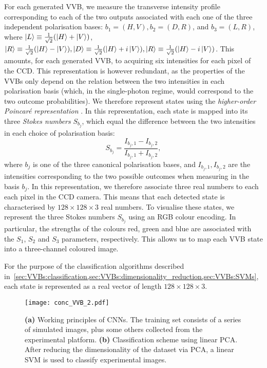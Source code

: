 For each generated \ac{VVB}, we measure the transverse intensity profile corresponding to each of the two outputs associated with each one of the three independent polarisation bases: $b_1=(H,V), b_2=(D,R)$, and $b_3=(L,R)$, where $\ket L\equiv \frac{1}{\sqrt2}(\ket H + \ket V)$, $\ket R\equiv \frac{1}{\sqrt2}(\ket H - \ket V), \ket D\equiv \frac{1}{\sqrt2}(\ket H + i \ket V), \ket R\equiv \frac{1}{\sqrt2}(\ket H - i \ket V)$.
This amounts, for each generated \ac{VVB}, to acquiring six intensities for each pixel of the \ac{CCD}. This representation is however redundant, as the properties of the VVBs only depend on the relation between the two intensities in each polarisation basis (which, in the single-photon regime, would correspond to the two outcome probabilities).
We therefore represent states using the \emph{higher-order Poincar\'e representation} \cite{milione2011higherorder,cardano2012polarization}. In this representation, each state is mapped into its three \emph{Stokes numbers} $S_{b_j}$, which equal the difference between the two intensities in each choice of polarisation basis:
\begin{equation}
  S_{b_j} = \frac{I_{b_j,1} - I_{b_j,2}}{I_{b_j,1} + I_{b_j,2}},
\end{equation}
where $b_j$ is one of the three canonical polarisation bases, and $I_{b_j,1}, I_{b_j,2}$ are the intensities corresponding to the two possible outcomes when measuring in the basis $b_j$.
In this representation, we therefore associate three real numbers to each each pixel in the \ac{CCD} camera. This means that each detected state is characterised by $128\times128\times3$ real numbers. To visualise these states, we represent the three Stokes numbers $S_{b_j}$ using an RGB colour encoding. In particular, the strengths of the colours red, green and blue are associated with the $S_{1}$, $S_{2}$ and $S_{3}$ parameters,  respectively.
This allows us to map each VVB state into a three-channel coloured image.

For the purpose of the classification algorithms described in~\cref{sec:VVBs:classification,sec:VVBs:dimensionality_reduction,sec:VVBs:SVMs}, each state is represented as a real vector of length $128\times128\times 3$.


\begin{figure}[tb]
	\centering
	\texttt{[image: conc\_VVB\_2.pdf]}
	\caption{
	\textbf{(a)}
	Working principles of \acp{CNN}. The training set consists of a series of simulated images, plus some others collected from the experimental platform.
	\textbf{(b)}
	Classification scheme using linear \ac{PCA}.
	After reducing the dimensionality of the dataset via \ac{PCA}, a linear \ac{SVM} is used to classify experimental images. 
	}
	\label{fig:VVBs:class_techniques}
\end{figure}

